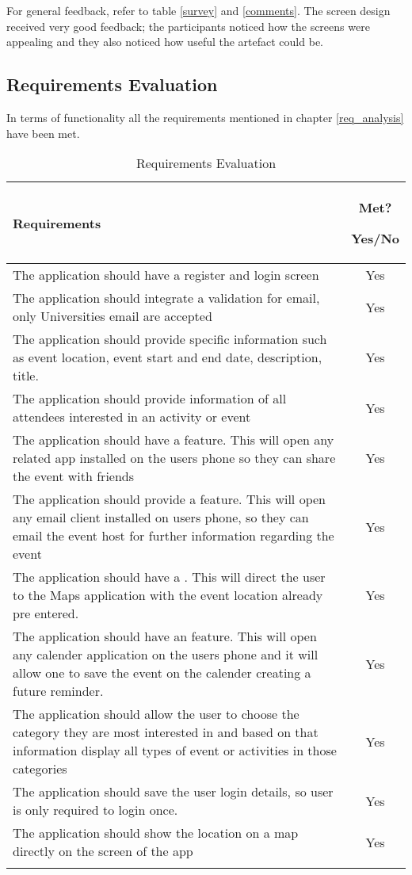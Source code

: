 For general feedback, refer to table \ref{survey} and \ref{comments}. The screen design received very good feedback; the participants noticed how the screens were appealing and they also noticed how useful the artefact could be.

\subsection{Requirements Evaluation}
In terms of functionality all the requirements mentioned in chapter \ref{req_analysis} have been met.

\begin{longtable}{|  L{10cm} | c |}
	\hline
	  Requirements\newline & Met? 
	  
	  \newline Yes/No
	   \\	
	\hline
	 The application should have a register and login screen & Yes  \\
	\hline
	 The application should integrate a validation for email, only \newline Universities email are accepted & Yes  \\
	\hline
	 The application should provide specific information such as event location, event start and end date, description, title. & Yes  \\
	\hline
	 The application should provide information of all attendees interested in an activity or event  & Yes \\
	\hline
	 The application should have a  feature. This will open any related app installed on the users phone so they can share the event with friends & Yes  \\
	\hline
	 The application should provide a  feature. This will open any email client installed on users phone, so they can email the event host for further information regarding the event & Yes  \\
	\hline
	 The application should have a . This will direct the user to the Maps application with the event location already pre entered.  & Yes \\
	\hline
	 The application should have an  feature. This will open any calender application on the users phone and it will allow one to save the event on the calender creating a future reminder. & Yes  \\
	\hline
	 The application should allow the user to choose the category they are most interested in and based on that information display all types of event or activities in those categories & Yes \\
	\hline
	  The application should save the user login details, so user is only required to login once. & Yes \\
	\hline
	The application should show the location on a map directly on the screen of the app  & Yes \\
	\hline
	\caption{Requirements Evaluation}
	\label{table:req_eval}
\end{longtable}	

